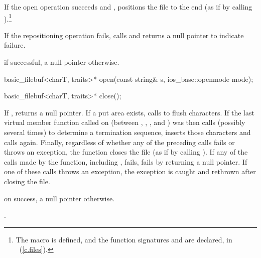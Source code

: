 \begin{itemdescr}
\pnum
If the open operation succeeds and
,
positions the file to the end
(as if by calling
).\footnote{The macro
is defined, and the function signatures
%
and
%
are declared, in
%
~(\ref{c.files}).}

\pnum
If the repositioning operation fails, calls
and returns a null pointer to indicate failure.

\pnum
\returns
{}
if successful, a null pointer otherwise.
\end{itemdescr}

%
\begin{itemdecl}
basic_filebuf<charT, traits>* open(const string& s,
                                   ios_base::openmode mode);
\end{itemdecl}

\begin{itemdescr}
\returns
{}
\end{itemdescr}

%
\begin{itemdecl}
basic_filebuf<charT, traits>* close();
\end{itemdecl}

\begin{itemdescr}
\pnum
\effects
If
,
returns a null pointer.
If a put area exists, calls
to flush characters.
If the last virtual member function called on
(between
,
,
,
and
)
was
then calls
(possibly several times) to determine a termination sequence, inserts those
characters and calls
again.
Finally, regardless of whether any of the preceding calls fails or throws an
exception, the function closes the file
(as if by calling
%
).
If any of the calls made by the function, including , fails,
 fails by returning a null pointer. If one of these calls throws an
exception, the exception is caught and rethrown after closing the file.

\pnum
\returns
{}
on success, a null pointer otherwise.

\pnum
\postcondition
{}.
\end{itemdescr}

